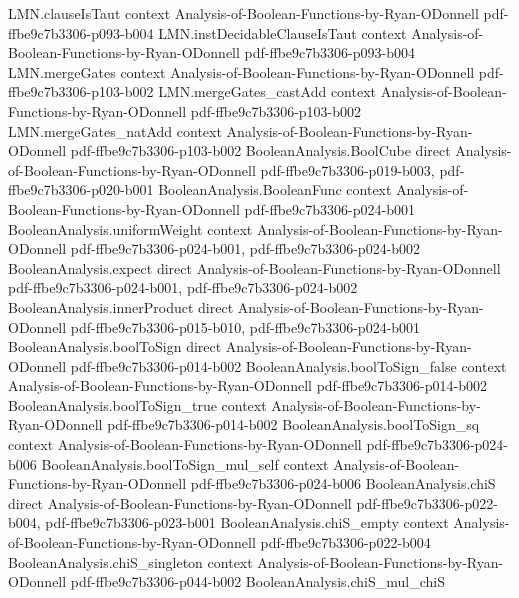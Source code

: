 \begin{lemma}
  {LMN.clauseIsTaut}
  {context}
  {Analysis-of-Boolean-Functions-by-Ryan-ODonnell}
  {pdf-ffbe9c7b3306-p093-b004}
\proofstep
  {LMN.instDecidableClauseIsTaut}
  {context}
  {Analysis-of-Boolean-Functions-by-Ryan-ODonnell}
  {pdf-ffbe9c7b3306-p093-b004}
\proofstep
  {LMN.mergeGates}
  {context}
  {Analysis-of-Boolean-Functions-by-Ryan-ODonnell}
  {pdf-ffbe9c7b3306-p103-b002}
\proofstep
  {LMN.mergeGates_castAdd}
  {context}
  {Analysis-of-Boolean-Functions-by-Ryan-ODonnell}
  {pdf-ffbe9c7b3306-p103-b002}
\proofstep
  {LMN.mergeGates_natAdd}
  {context}
  {Analysis-of-Boolean-Functions-by-Ryan-ODonnell}
  {pdf-ffbe9c7b3306-p103-b002}
\proofstep
  {BooleanAnalysis.BoolCube}
  {direct}
  {Analysis-of-Boolean-Functions-by-Ryan-ODonnell}
  {pdf-ffbe9c7b3306-p019-b003,
    pdf-ffbe9c7b3306-p020-b001}
\proofstep
  {BooleanAnalysis.BooleanFunc}
  {context}
  {Analysis-of-Boolean-Functions-by-Ryan-ODonnell}
  {pdf-ffbe9c7b3306-p024-b001}
\proofstep
  {BooleanAnalysis.uniformWeight}
  {context}
  {Analysis-of-Boolean-Functions-by-Ryan-ODonnell}
  {pdf-ffbe9c7b3306-p024-b001,
    pdf-ffbe9c7b3306-p024-b002}
\proofstep
  {BooleanAnalysis.expect}
  {direct}
  {Analysis-of-Boolean-Functions-by-Ryan-ODonnell}
  {pdf-ffbe9c7b3306-p024-b001,
    pdf-ffbe9c7b3306-p024-b002}
\proofstep
  {BooleanAnalysis.innerProduct}
  {direct}
  {Analysis-of-Boolean-Functions-by-Ryan-ODonnell}
  {pdf-ffbe9c7b3306-p015-b010,
    pdf-ffbe9c7b3306-p024-b001}
\proofstep
  {BooleanAnalysis.boolToSign}
  {direct}
  {Analysis-of-Boolean-Functions-by-Ryan-ODonnell}
  {pdf-ffbe9c7b3306-p014-b002}
\proofstep
  {BooleanAnalysis.boolToSign_false}
  {context}
  {Analysis-of-Boolean-Functions-by-Ryan-ODonnell}
  {pdf-ffbe9c7b3306-p014-b002}
\proofstep
  {BooleanAnalysis.boolToSign_true}
  {context}
  {Analysis-of-Boolean-Functions-by-Ryan-ODonnell}
  {pdf-ffbe9c7b3306-p014-b002}
\proofstep
  {BooleanAnalysis.boolToSign_sq}
  {context}
  {Analysis-of-Boolean-Functions-by-Ryan-ODonnell}
  {pdf-ffbe9c7b3306-p024-b006}
\proofstep
  {BooleanAnalysis.boolToSign_mul_self}
  {context}
  {Analysis-of-Boolean-Functions-by-Ryan-ODonnell}
  {pdf-ffbe9c7b3306-p024-b006}
\proofstep
  {BooleanAnalysis.chiS}
  {direct}
  {Analysis-of-Boolean-Functions-by-Ryan-ODonnell}
  {pdf-ffbe9c7b3306-p022-b004,
    pdf-ffbe9c7b3306-p023-b001}
\proofstep
  {BooleanAnalysis.chiS_empty}
  {context}
  {Analysis-of-Boolean-Functions-by-Ryan-ODonnell}
  {pdf-ffbe9c7b3306-p022-b004}
\proofstep
  {BooleanAnalysis.chiS_singleton}
  {context}
  {Analysis-of-Boolean-Functions-by-Ryan-ODonnell}
  {pdf-ffbe9c7b3306-p044-b002}
\proofstep
  {BooleanAnalysis.chiS_mul_chiS}

\end{lemma}
